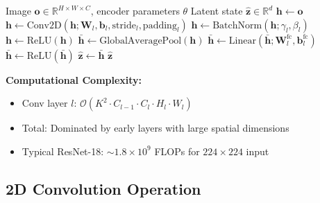 \begin{algorithm}[H]
\caption{CNN Encoder for State Estimation}
\label{alg:cnn_encoder}
\begin{algorithmic}[1]
\REQUIRE Image $\mathbf{o} \in \mathbb{R}^{H \times W \times C}$, encoder parameters $\theta$
\ENSURE Latent state $\hat{\mathbf{z}} \in \mathbb{R}^d$
\STATE {}
\STATE $\mathbf{h} \gets \mathbf{o}$
    \STATE $\mathbf{h} \gets \text{Conv2D}(\mathbf{h}; \mathbf{W}_l, \mathbf{b}_l, \text{stride}_l, \text{padding}_l)$
    \STATE $\mathbf{h} \gets \text{BatchNorm}(\mathbf{h}; \gamma_l, \beta_l)$
    \STATE $\mathbf{h} \gets \text{ReLU}(\mathbf{h})$
\ENDFOR
\STATE
\STATE {}
\STATE $\bar{\mathbf{h}} \gets \text{GlobalAveragePool}(\mathbf{h})$ 
\STATE
\STATE {}
    \STATE $\bar{\mathbf{h}} \gets \text{Linear}(\bar{\mathbf{h}}; \mathbf{W}_l^{\text{fc}}, \mathbf{b}_l^{\text{fc}})$
        \STATE $\bar{\mathbf{h}} \gets \text{ReLU}(\bar{\mathbf{h}})$
    \ENDIF
\ENDFOR
\STATE
\STATE $\hat{\mathbf{z}} \gets \bar{\mathbf{h}}$
\RETURN $\hat{\mathbf{z}}$
\end{algorithmic}
\end{algorithm}

\textbf{Computational Complexity:}
\begin{itemize}
    \item Conv layer $l$: $\mathcal{O}(K^2 \cdot C_{l-1} \cdot C_l \cdot H_l \cdot W_l)$
    \item Total: Dominated by early layers with large spatial dimensions
    \item Typical ResNet-18: $\sim 1.8 \times 10^9$ FLOPs for $224 \times 224$ input
\end{itemize}

\subsection{2D Convolution Operation}

